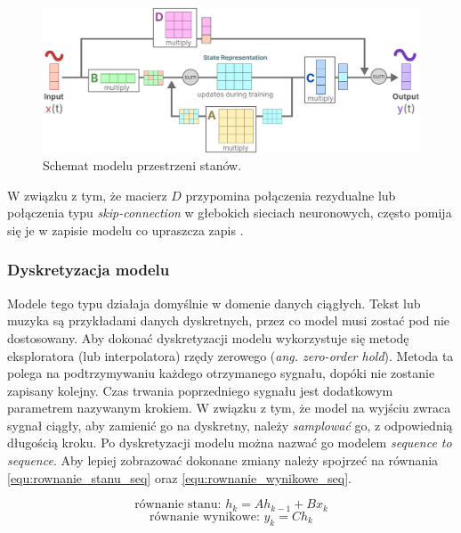 \documentclass[data-science]{agh-wi} %
\begin{document}
\begin{figure}[ht!]
    \begin{center}
        \includegraphics[width=0.9\linewidth]{./img/SSM_scheme.png}
    \end{center}
    \caption{Schemat modelu przestrzeni stanów.}\label{fig:ssm_scheme}
\end{figure}

W związku z tym, że macierz $D$ przypomina połączenia rezydualne lub połączenia typu \textit{skip-connection} w głebokich sieciach neuronowych, często pomija się je w zapisie modelu co upraszcza zapis \cite{res_net}.

\subsubsection*{Dyskretyzacja modelu}
Modele tego typu działaja domyślnie w domenie danych ciągłych. Tekst lub muzyka są przykładami danych dyskretnych, przez co model musi zostać pod nie dostosowany. Aby dokonać dyskretyzacji modelu wykorzystuje się metodę eksploratora (lub interpolatora) rzędy zerowego (\textit{ang. zero-order hold}). Metoda ta polega na podtrzymywaniu każdego otrzymanego sygnału, dopóki nie zostanie zapisany kolejny. Czas trwania poprzedniego sygnału jest dodatkowym parametrem nazywanym krokiem. W związku z tym, że model na wyjściu zwraca sygnał ciągły, aby zamienić go na dyskretny, należy \textit{samplować} go, z odpowiednią długością kroku. Po dyskretyzacji modelu można nazwać go modelem \textit{sequence to sequence}. Aby lepiej zobrazować dokonane zmiany należy spojrzeć na równania \ref*{equ:rownanie_stanu_seq} oraz \ref*{equ:rownanie_wynikowe_seq}.

\begin{equation}
    \text{równanie stanu: }h_k = Ah_{k-1} + Bx_k
    \label{equ:rownanie_stanu_seq}
\end{equation}
\begin{equation}
    \text{równanie wynikowe: }y_k = Ch_k
    \label{equ:rownanie_wynikowe_seq}
\end{equation}
\end{document}
